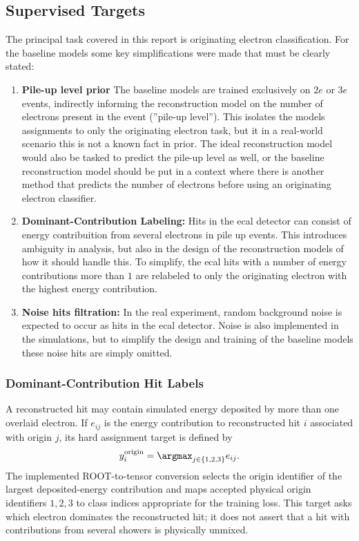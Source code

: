 \subsection{Supervised Targets}
\label{sec:method_targets}

The principal task covered in this report is originating electron classification. For the baseline models some key simplifications were made that must be clearly stated:

\begin{enumerate}
    \item \textbf{Pile-up level prior} The baseline models are trained exclusively on $2e$ or $3e$ events, indirectly informing the reconstruction model on the number of electrons present in the event (''pile-up level''). This isolates the models assignments to only the originating electron task, but it in a real-world scenario this is not a known fact in prior. The ideal reconstruction model would also be tasked to predict the pile-up level as well, or the baseline reconstruction model should be put in a context where there is another method that predicts the number of electrons before using an originating electron classifier. 
    \item \textbf{Dominant-Contribution Labeling:} Hits in the \gls{ecal} detector can consist of energy contribuition from several electrons in pile up events. This introduces ambiguity in analysis, but also in the design of the reconstruction models of how it should handle this. To simplify, the \gls{ecal} hits with a number of energy contributions more than $1$ are relabeled to only the originating electron with the highest energy contribution. 
    \item \textbf{Noise hits filtration:} In the real experiment, random background noise is expected to occur as hits in the \gls{ecal} detector. Noise is also implemented in the simulations, but to simplify the design and training of the baseline models these noise hits are simply omitted. 
\end{enumerate}

\subsubsection{Dominant-Contribution Hit Labels}

A reconstructed hit may contain simulated energy deposited by more than one
overlaid electron. If \(e_{ij}\) is the energy contribution to reconstructed
hit \(i\) associated with origin \(j\), its hard assignment target is defined
by
\begin{equation}
    y_i^{\mathrm{origin}} =
    \argmax_{j \in \{1,2,3\}} e_{ij}.
    \label{eq:dominant_origin_target}
\end{equation}
The implemented ROOT-to-tensor conversion selects the origin identifier of
the largest deposited-energy contribution and maps accepted physical origin
identifiers \(1,2,3\) to class indices appropriate for the training loss.
This target asks which electron dominates the reconstructed hit; it does not
assert that a hit with contributions from several showers is physically
unmixed.


